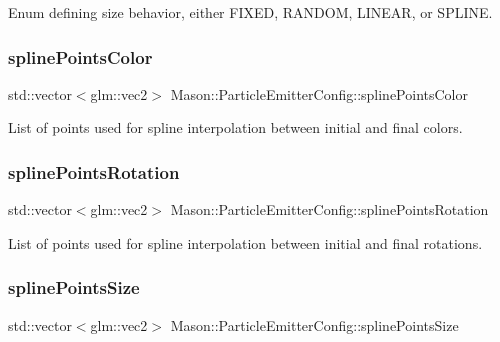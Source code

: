Enum defining size behavior, either F\+I\+X\+ED, R\+A\+N\+D\+OM, L\+I\+N\+E\+AR, or S\+P\+L\+I\+NE. 

\hypertarget{struct_mason_1_1_particle_emitter_config_a66a4652dce73b58e27b8a495e2b6e0eb}{}\label{struct_mason_1_1_particle_emitter_config_a66a4652dce73b58e27b8a495e2b6e0eb} 
\subsubsection{\texorpdfstring{spline\+Points\+Color}{splinePointsColor}}
{\footnotesize\ttfamily std\+::vector$<$glm\+::vec2$>$ Mason\+::\+Particle\+Emitter\+Config\+::spline\+Points\+Color}



List of points used for spline interpolation between initial and final colors. 

\hypertarget{struct_mason_1_1_particle_emitter_config_ae03fbdb37c6738eafedc10564d744e8e}{}\label{struct_mason_1_1_particle_emitter_config_ae03fbdb37c6738eafedc10564d744e8e} 
\subsubsection{\texorpdfstring{spline\+Points\+Rotation}{splinePointsRotation}}
{\footnotesize\ttfamily std\+::vector$<$glm\+::vec2$>$ Mason\+::\+Particle\+Emitter\+Config\+::spline\+Points\+Rotation}



List of points used for spline interpolation between initial and final rotations. 

\hypertarget{struct_mason_1_1_particle_emitter_config_ae379890e2a2de9c8f4dc1a391393f41a}{}\label{struct_mason_1_1_particle_emitter_config_ae379890e2a2de9c8f4dc1a391393f41a} 
\subsubsection{\texorpdfstring{spline\+Points\+Size}{splinePointsSize}}
{\footnotesize\ttfamily std\+::vector$<$glm\+::vec2$>$ Mason\+::\+Particle\+Emitter\+Config\+::spline\+Points\+Size}



